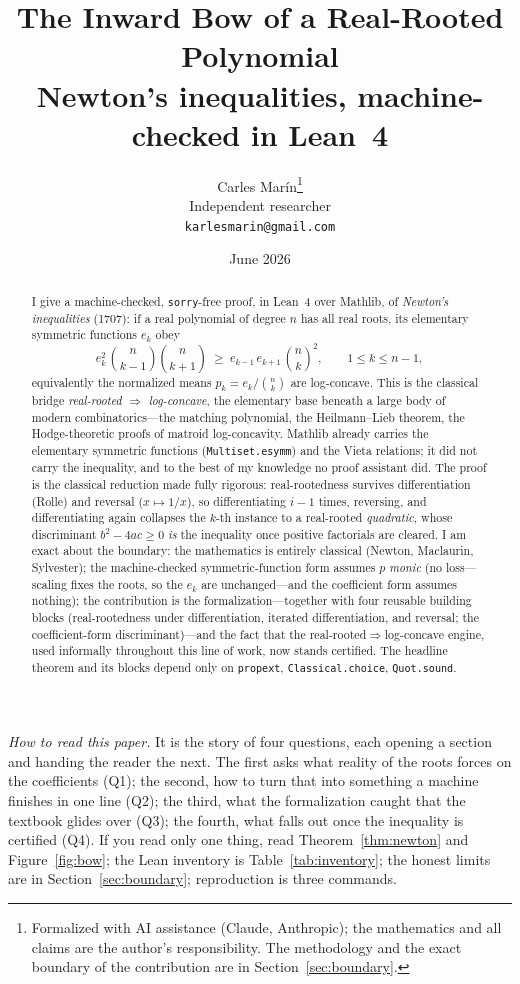 \documentclass[11pt]{article}
\title{\bf The Inward Bow of a Real-Rooted Polynomial\\[4pt]
  \large\normalfont Newton's inequalities, machine-checked in Lean~4}
\author{Carles Mar\'in\thanks{Formalized with AI assistance (Claude, Anthropic); the
mathematics and all claims are the author's responsibility. The methodology and the exact
boundary of the contribution are in Section~\ref{sec:boundary}.}\\[3pt]
  \normalsize Independent researcher\\
  \normalsize \texttt{karlesmarin@gmail.com}}
\date{June 2026}
\newcommand{\lean}[1]{\texttt{#1}}
\begin{document}
\maketitle

\begin{abstract}
I give a machine-checked, \lean{sorry}-free proof, in Lean~4 over Mathlib, of \emph{Newton's
inequalities} (1707): if a real polynomial of degree $n$ has all real roots, its
elementary symmetric functions $e_k$ obey
\[
  e_k^2\,\binom{n}{k-1}\binom{n}{k+1}\;\ge\;e_{k-1}\,e_{k+1}\,\binom{n}{k}^{2},
  \qquad 1\le k\le n-1,
\]
equivalently the normalized means $p_k=e_k/\binom{n}{k}$ are log-concave. This is the
classical bridge \emph{real-rooted $\Rightarrow$ log-concave}, the elementary base beneath a
large body of modern combinatorics---the matching polynomial, the Heilmann--Lieb theorem, the
Hodge-theoretic proofs of matroid log-concavity. Mathlib already carries the elementary
symmetric functions (\lean{Multiset.esymm}) and the Vieta relations; it did not carry the
inequality, and to the best of my knowledge no proof assistant did. The proof is the classical
reduction made fully rigorous: real-rootedness survives differentiation (Rolle) and reversal
($x\mapsto1/x$), so differentiating $i-1$ times, reversing, and differentiating again collapses
the $k$-th instance to a real-rooted \emph{quadratic}, whose discriminant $b^2-4ac\ge0$ \emph{is}
the inequality once positive factorials are cleared. I am exact about the boundary: the
mathematics is entirely classical (Newton, Maclaurin, Sylvester); the machine-checked
symmetric-function form assumes $p$ \emph{monic} (no loss---scaling fixes the roots, so the $e_k$
are unchanged---and the coefficient form assumes nothing); the contribution is the
formalization---together with four reusable building blocks (real-rootedness under
differentiation, iterated differentiation, and reversal; the coefficient-form discriminant)---and
the fact that the real-rooted$\Rightarrow$log-concave engine, used informally throughout this
line of work, now stands certified. The headline theorem and its blocks depend only on
\lean{propext}, \lean{Classical.choice}, \lean{Quot.sound}.
\end{abstract}

\medskip
\noindent\emph{How to read this paper.} It is the story of four questions, each opening a
section and handing the reader the next. The first asks what reality of the roots forces on the
coefficients (Q1); the second, how to turn that into something a machine finishes in one line
(Q2); the third, what the formalization caught that the textbook glides over (Q3); the fourth,
what falls out once the inequality is certified (Q4). If you read only one thing, read
Theorem~\ref{thm:newton} and Figure~\ref{fig:bow}; the Lean inventory is
Table~\ref{tab:inventory}; the honest limits are in Section~\ref{sec:boundary}; reproduction is
three commands.
\end{document}
